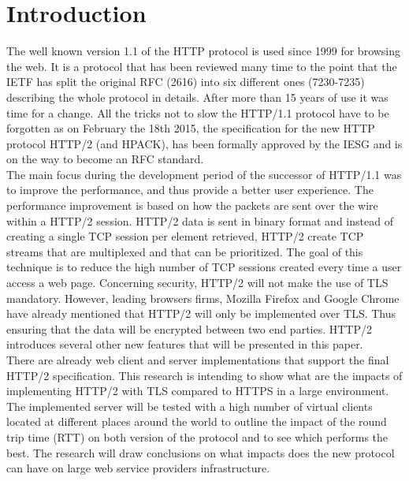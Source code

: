 \section{Introduction}
\label{chap:intro}
The well known version 1.1 of the HTTP protocol is used since 1999 for browsing the web. It is a protocol that has been reviewed many time to the point that the IETF has split the original RFC (2616\cite{RFC2616}) into six different ones (7230-7235\cite{RFC723x}) describing the whole protocol in details. After more than 15 years of use it was time for a change. All the tricks not to slow the HTTP/1.1 protocol have to be forgotten as on February the 18th 2015, the specification \cite{http2} for the new HTTP protocol HTTP/2 (and HPACK\cite{hpack}), has been formally approved by the IESG and is on the way to become an RFC standard.   \\
The main focus during the development period of the successor of HTTP/1.1 was to improve the performance, and thus provide a better user experience. The performance improvement is based on how the packets are sent over the wire within a HTTP/2 session. HTTP/2 data is sent in binary format and instead of creating a single TCP session per element retrieved, HTTP/2 create TCP streams that are multiplexed and that can be prioritized. The goal of this technique is to reduce the high number of TCP sessions created every time a user access a web page. Concerning security, HTTP/2 will not make the use of TLS mandatory. However, leading browsers firms, Mozilla Firefox and Google Chrome have already mentioned that HTTP/2 will only be implemented over TLS. Thus ensuring that the data will be encrypted between two end parties. HTTP/2 introduces several other new features that will be presented in this paper. \\
There are already web client and server implementations\cite{http2-imp} that support the final HTTP/2 specification. This research is intending to show what are the impacts of implementing HTTP/2 with TLS compared to HTTPS in a large environment. The implemented server will be tested with a high number of virtual clients located at different places around the world to outline the impact of the round trip time (RTT) on both version of the protocol and to see which performs the best. The research will draw conclusions on what impacts does the new protocol can have on large web service providers infrastructure.